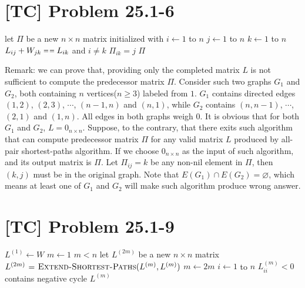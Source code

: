 \documentclass[a4paper,11pt,twocolumn]{article}
\newcommand{\NIL}{\const{nil}}
\begin{document}
  \section{[TC] Problem 25.1-6}
  \begin{codebox}
    \li let $\Pi$ be a new $n \times n$ matrix initialized with \NIL
    \li \For $i \gets 1$ to $n$
    \li \Do  \For $j \gets 1$ to $n$
    \li      \Do  \For $k \gets 1$ to $n$
    \li           \Do  \If $L_{ij}+ W_{jk} \isequal L_{ik}$ and $i \neq k$
    \li                \Do $\Pi_{ik} = j$
                       \End
                  \End
             \End
        \End
    \li \Return $\Pi$
  \end{codebox}
  Remark: we can prove that, providing only the completed matrix $L$ is not sufficient to compute the predecessor matrix $\Pi$. Consider such two graphs $G_1$ and $G_2$, both containing $n$ vertices($n \geq 3$) labeled from $1$. $G_1$ contains directed edges $(1, 2)$, $(2, 3)$, $\cdots$, $(n-1, n)$ and $(n, 1)$, while $G_2$ contains $(n, n-1)$, $\cdots$, $(2, 1)$ and $(1, n)$. All edges in both graphs weigh $0$. It is obvious that for both $G_1$ and $G_2$, $L = 0_{n \times n}$.  Suppose, to the contrary, that there exits such algorithm that can compute predecessor matrix $\Pi$ for any valid matrix $L$ produced by all-pair shortest-paths algorithm. If we choose $0_{n \times n}$ as the input of such algorithm, and its output matrix is $\Pi$. Let $\Pi_{ij} = k$ be any non-nil element in $\Pi$, then $(k, j)$ must be in the original graph. Note that $E(G_1) \cap E(G_2) = \varnothing$, which means at least one of $G_1$ and $G_2$ will make such algorithm produce wrong answer.

  \section{[TC] Problem 25.1-9}
  \begin{codebox}
    \li $L^{(1)} \gets W$
    \li $m \gets 1$
    \li \While $m < n$
    \li \Do let $L^{(2m)}$ be a new $n \times n$ matrix
    \li     $L^{(2m)} \mathrel{\hspace{1pt}=\hspace{1pt}}  \textnormal{\scshape Extend-Shortest-Paths}(L^{(m)}, L^{(m)})$
    \li     $m \gets 2m$
        \End
    \li \For $i \gets 1$ to $n$
    \li \Do \If $L^{(m)}_{ii} < 0$
    \li     \Do \Error contains negative cycle
            \End
        \End
    \li \Return $L^{(m)}$
  \end{codebox}
\end{document}
